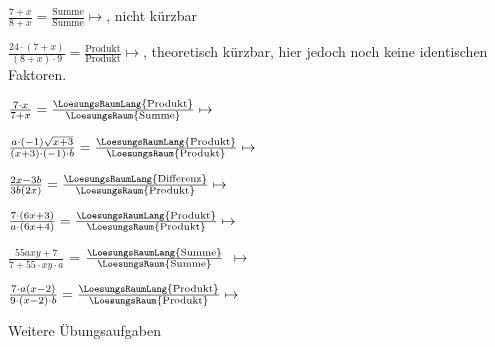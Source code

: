 \begin{bbwAufgabenBlock}
\item  $\frac{7+x}{8+x} = \frac{\textrm{Summe}}{\textrm{Summe}} \mapsto $, nicht kürzbar

\item  $\frac{24\cdot{}(7+x)}{(8+x)\cdot{}9}
= \frac{\textrm{Produkt}}{\textrm{Produkt}} \mapsto $, theoretisch kürzbar, hier jedoch noch keine identischen Faktoren.

\item $\frac{7\cdot{}x}{7+x} = \frac{\LoesungsRaumLang{\textrm{Produkt}}}{\LoesungsRaum{\textrm{Summe}}} \mapsto $

\item $\frac{a\cdot{}(-1)\sqrt{x+3}}{(x+3)\cdot{}(-1)\cdot{}b}
= \frac{\LoesungsRaumLang{\textrm{Produkt}}}{\LoesungsRaum{\textrm{Produkt}}} \mapsto
$ 

\item $\frac{2x-3b}{3b(2x)} = \frac{\LoesungsRaumLang{\textrm{Differenz}}}{\LoesungsRaum{\textrm{Produkt}}} \mapsto $

\item $\frac{7\cdot{}(6x+3)}{a\cdot{}(6x+4)}
= \frac{\LoesungsRaumLang{\textrm{Produkt}}}{\LoesungsRaum{\textrm{Produkt}}} \mapsto
$ 

\item $\frac{55axy+7}{7+55\cdot{}xy\cdot{}a}$ =
$\frac{\LoesungsRaumLang{\textrm{Summe}}}{\LoesungsRaum{\textrm{Summe}}}$  $\mapsto$

\item $\frac{7\cdot{}a(x-2)}{9\cdot{}(x-2)\cdot{}b} = \frac{\LoesungsRaumLang{\textrm{Produkt}}}{\LoesungsRaum{\textrm{Produkt}}} \mapsto $ 

\end{bbwAufgabenBlock}

\platzFuerBerechnungenBisEndeSeite{}
\TRAINER{\newpage}

Weitere Übungsaufgaben


